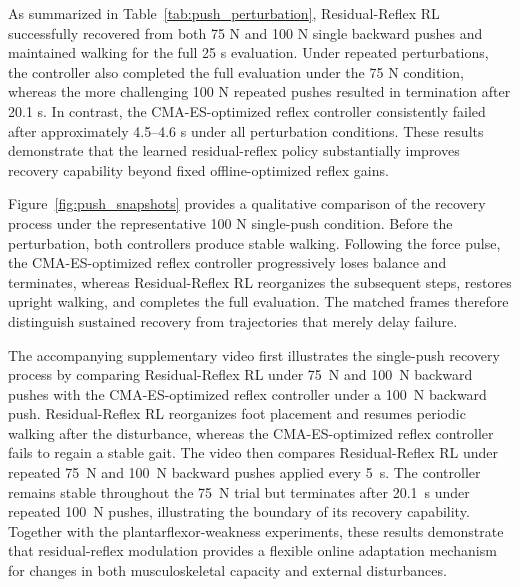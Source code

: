\documentclass[manuscript,screen,review,anonymous]{acmart}
\newcommand{\suppvideo}{supplementary video}
\begin{document}
As summarized in Table~\ref{tab:push_perturbation}, Residual-Reflex RL successfully recovered from both 75 N and 100 N single backward pushes and maintained walking for the full 25 s evaluation. Under repeated perturbations, the controller also completed the full evaluation under the 75 N condition, whereas the more challenging 100 N repeated pushes resulted in termination after 20.1 s. In contrast, the CMA-ES-optimized reflex controller consistently failed after approximately 4.5–4.6 s under all perturbation conditions. These results demonstrate that the learned residual-reflex policy substantially improves recovery capability beyond fixed offline-optimized reflex gains.

Figure~\ref{fig:push_snapshots} provides a qualitative comparison of the recovery process under the representative 100 N single-push condition. Before the perturbation, both controllers produce stable walking. Following the force pulse, the CMA-ES-optimized reflex controller progressively loses balance and terminates, whereas Residual-Reflex RL reorganizes the subsequent steps, restores upright walking, and completes the full evaluation. The matched frames therefore distinguish sustained recovery from trajectories that merely delay failure.

The accompanying \suppvideo{} first illustrates the single-push recovery process by comparing Residual-Reflex RL under 75~N and 100~N backward pushes with the CMA-ES-optimized reflex controller under a 100~N backward push. Residual-Reflex RL reorganizes foot placement and resumes periodic walking after the disturbance, whereas the CMA-ES-optimized reflex controller fails to regain a stable gait. The video then compares Residual-Reflex RL under repeated 75~N and 100~N backward pushes applied every 5~s. The controller remains stable throughout the 75~N trial but terminates after 20.1~s under repeated 100~N pushes, illustrating the boundary of its recovery capability. Together with the plantarflexor-weakness experiments, these results demonstrate that residual-reflex modulation provides a flexible online adaptation mechanism for changes in both musculoskeletal capacity and external disturbances.
\end{document}
